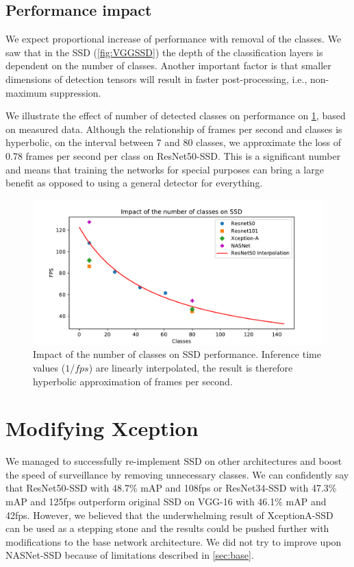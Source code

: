 \subsection{Performance impact}
We expect proportional increase of performance with removal of the classes. We saw that in the SSD (\cref{fig:VGGSSD}) the depth of the classification layers is dependent on the number of classes. Another important factor is that smaller dimensions of detection tensors will result in faster post-processing, i.e., non-maximum suppression. 

We illustrate the effect of number of detected classes on performance on \cref{fig:fpscls}, based on measured data. Although the relationship of frames per second and classes is hyperbolic, on the interval between 7 and 80 classes, we approximate the loss of 0.78 frames per second per class on ResNet50-SSD. This is a significant number and means that training the networks for special purposes can bring a large benefit as opposed to using a general detector for everything.

\begin{figure}
    \centering
    \includegraphics[width=\textwidth]{img/fps_cls}
    \caption[Impact of the number of classes on SSD performance]{Impact of the number of classes on SSD performance. Inference time values ($1/fps$) are linearly interpolated, the result is therefore hyperbolic approximation of frames per second.}
    \label{fig:fpscls}
\end{figure}


\section{Modifying Xception}
\label{sec:fixxception}
We managed to successfully re-implement SSD on other architectures and boost the speed of surveillance by removing unnecessary classes. We can confidently say that ResNet50-SSD with 48.7\% mAP and 108fps or ResNet34-SSD with 47.3\% mAP and 125fps outperform original SSD on VGG-16 with 46.1\% mAP and 42fps. However, we believed that the underwhelming result of XceptionA-SSD can be used as a stepping stone and the results could be pushed further with modifications to the base network architecture. We did not try to improve upon NASNet-SSD because of limitations described in \cref{sec:base}.

